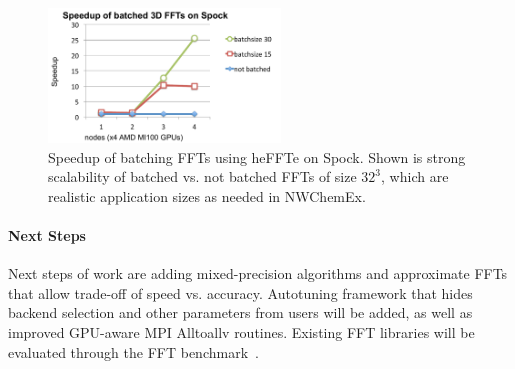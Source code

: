 \begin{figure}[htb]
   \centering
   \includegraphics[width=0.55\textwidth]{projects/2.3.3-MathLibs/2.3.3.13-CLOVER/batchedFFT-Spock.pdf}
    \caption{\label{fig:fft-batched}
    Speedup of batching FFTs using heFFTe on Spock.
    Shown is strong scalability of batched vs. not batched FFTs of 
    size $32^3$, which are realistic application sizes as needed in NWChemEx.
    }
\end{figure}


\paragraph{Next Steps}
Next steps of work are adding mixed-precision algorithms and approximate FFTs that 
allow trade-off of speed vs. accuracy.
Autotuning framework that hides backend selection and other parameters from users
will be added, as well as improved GPU-aware MPI Alltoallv routines. 
Existing FFT libraries will be evaluated through the FFT 
benchmark~\cite{fftbenchmark}.

